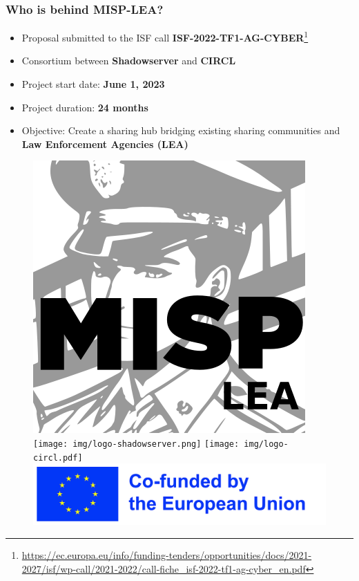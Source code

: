 \begin{frame}
    \frametitle{Who is behind MISP-LEA?}

    \begin{itemize}
            \item Proposal submitted to the ISF call \textbf{ISF-2022-TF1-AG-CYBER}\footnote{\scriptsize{\url{https://ec.europa.eu/info/funding-tenders/opportunities/docs/2021-2027/isf/wp-call/2021-2022/call-fiche_isf-2022-tf1-ag-cyber_en.pdf}}}
        \item Consortium between \textbf{Shadowserver} and \textbf{CIRCL}
        \item Project start date: \textbf{June 1, 2023}
        \item Project duration: \textbf{24 months}
        \item Objective: Create a sharing hub bridging existing sharing communities and \textbf{Law Enforcement Agencies (LEA)}
    \end{itemize}

    \vspace{1em}

    \begin{figure}
        \centering
        \includegraphics[scale=0.2]{img/misp-lea.png} \\[1em]
        \texttt{[image: img/logo-shadowserver.png]}
        \hspace{1em}
        \texttt{[image: img/logo-circl.pdf]}
        \hspace{1em}
        \includegraphics[scale=0.4]{img/eu_funded_en.jpg}
    \end{figure}

\end{frame}

